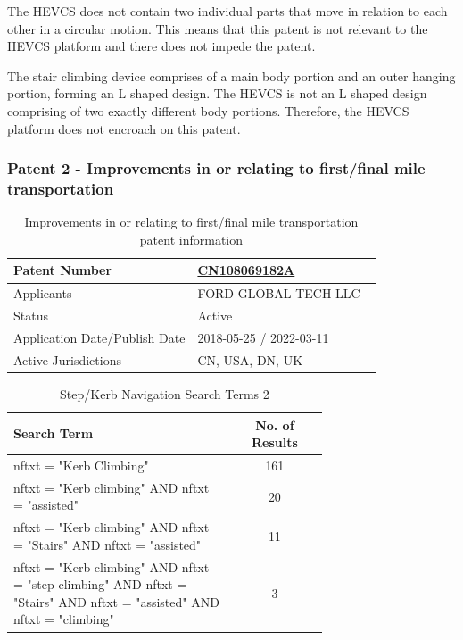 \documentclass [12pt]{article}
\begin{document}
The HEVCS does not contain two individual parts that move in relation to each other in a circular motion.
This means that this patent is not relevant to the HEVCS platform and there does not impede the patent.

The stair climbing device comprises of a main body portion and an outer hanging portion, forming an L shaped design.
The HEVCS is not an L shaped design comprising of two exactly different body portions. Therefore, the HEVCS platform does not encroach on this patent.

\subsubsection{Patent 2 - Improvements in or relating to first/final mile transportation}

\begin{table}[H]
    \centering
    \setlength{\arrayrulewidth}{1.5pt}
    \begin{tabular}{|p{0.5\linewidth}|p{0.5\linewidth}|}
    \hline
    Patent Number & \href{https://worldwide.espacenet.com/patent/search/family/062016996/publication/CN108069182A?q=CN108069182A}{CN108069182A} \\
    \hline
    Applicants & FORD GLOBAL TECH LLC\\
    \hline
    Status & Active\\
    \hline
    Application Date/Publish Date & 2018-05-25 / 2022-03-11\\
    \hline
    Active Jurisdictions & CN, USA, DN, UK\\
    \hline
    \end{tabular}
    \caption{Improvements in or relating to first/final mile transportation patent information}
    \label{table:improvements_in_or_relating_to_first_final_mile_transportation_patent_information}
\end{table}

\begin{table}[H]
    \centering
    \setlength{\arrayrulewidth}{1.5pt}
    \begin{tabular}{|p{0.7\linewidth}|c|}
    \hline
    \cellcolor{gray!40}Search Term & \cellcolor{gray!40}No. of Results \\
    \hline
    nftxt = "Kerb Climbing" & 161 \\
    \hline
    nftxt = "Kerb climbing" AND nftxt = "assisted" & 20 \\
    \hline
    nftxt = "Kerb climbing" AND nftxt = "Stairs" AND nftxt = "assisted" & 11 \\
    \hline
    nftxt = "Kerb climbing" AND nftxt = "step climbing" AND nftxt = "Stairs" AND nftxt = "assisted" AND nftxt = "climbing" & 3 \\
    \hline
    \end{tabular}
    \caption{Step/Kerb Navigation Search Terms 2}
    \label{table:step_Kerb_nav_st_2}
\end{table}
\end{document}
